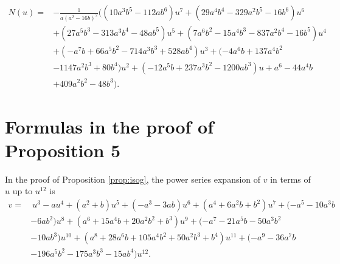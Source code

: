 \documentclass{gtpart}
\theoremstyle{definition}
\theoremstyle{remark}
\begin{document}
\begin{equation*}
\begin{split}
   N(u) = & -\frac{1}{a (a^2 - 16 b)^2} \big( (10 a^3 b^5 - 112 a b^6) u^7 + (29 a^4 b^4 - 329 a^2 b^5 - 16 b^6) u^6 \\
          & + (27 a^5 b^3 - 313 a^3 b^4 - 48 a b^5 ) u^5 + (7 a^6 b^2 - 15 a^4 b^3 - 837 a^2 b^4 - 16 b^5) u^4 \\
          & + (-a^7 b + 66 a^5 b^2 - 714 a^3 b^3 + 528 a b^4) u^3 + (-4 a^6 b + 137 a^4 b^2 \\
          & - 1147 a^2 b^3 + 80 b^4) u^2 + (-12 a^5 b + 237 a^3 b^2 - 1200 a b^3) u + a^6 - 44 a^4 b \\
          & + 409 a^2 b^2 - 48 b^3 \big).  
\end{split}
\end{equation*}


\section{Formulas in the proof of Proposition 5}
\label{apx:isog}

In the proof of Proposition \ref{prop:isog}, the power series expansion 
of $v$ in terms of $u$ up to $u^{12}$ is 
\begin{equation*}
\begin{split}
 v = & ~ u^3 - a u^4 + (a^2 + b) u^5 + (-a^3 - 3 a b) u^6 + (a^4 + 6 a^2 b + b^2) u^7 + (-a^5 - 10 a^3 b \\
     & - 6 a b^2) u^8 + (a^6 + 15 a^4 b + 20 a^2 b^2 + b^3) u^9 + (-a^7 - 21 a^5 b - 50 a^3 b^2 \\
     & - 10 a b^3) u^{10} + (a^8 + 28 a^6 b + 105 a^4 b^2 + 50 a^2 b^3 + b^4) u^{11} + (-a^9 - 36 a^7 b \\
     & - 196 a^5 b^2 - 175 a^3 b^3 - 15 a b^4) u^{12}.  
\end{split}
\end{equation*}
\end{document}
